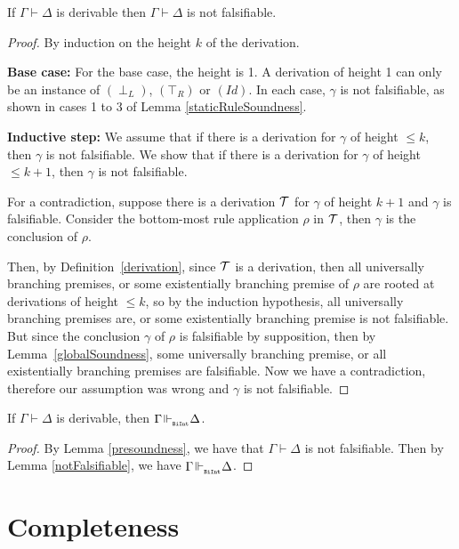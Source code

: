 \documentclass{llncs}
\numberwithin{equation}{section}
\newcommand{\Lg}[1]{\mathtt{#1}}
\newcommand{\sequent}{\vdash}
\newcommand{\Bottom}{\perp}
\newcommand{\Top}{\top}
\newcommand{\mycal}[1]{
        {\cal{#1}}
}
\newcommand {\BiInt}{
        \Lg{BiInt}
}
\newcommand{\tree}[1]{
        {\mycal{#1}}
}
\newcommand{\IdRule}{(Id)}
\newcommand{\FalseLeftRule}{(\Bottom_L)}
\newcommand{\TrueRightRule}{(\Top_R)}
\newcommand{\entails}{\hspace{-0.05cm}\Vdash_{_{\BiInt}}\hspace{-0.1cm}}
\begin{document}
\begin{lemma}\label{presoundness} If $\Gamma \sequent \Delta$ is derivable then $\Gamma \sequent \Delta$ is not falsifiable.
\end{lemma}
\begin{proof}
By induction on the height $k$ of the derivation. 

\textbf{Base case:} For the base case, the height is 1. A derivation of height 1 can only be an instance of $\FalseLeftRule$, $\TrueRightRule$ or $\IdRule$. In each case, $\gamma$ is not falsifiable, as shown in cases 1 to 3 of Lemma \ref{staticRuleSoundness}.

\textbf{Inductive step:} We assume that if there is a derivation for $\gamma$ of height $\leq k$, then $\gamma$ is not falsifiable. We show that if there is a derivation for $\gamma$ of height $\leq k+1$, then $\gamma$ is not falsifiable. 

For a contradiction, suppose there is a derivation $\tree{T}$ for $\gamma$ of height $k+1$ and $\gamma$ is falsifiable. Consider the bottom-most rule application $\rho$ in $\tree{T}$, then $\gamma$ is the conclusion of $\rho$.

Then, by Definition~\ref{derivation}, since $\tree{T}$ is a derivation, then all universally branching premises, or some existentially branching premise of $\rho$ are rooted at derivations of height $\leq k$, so by the induction hypothesis, all universally branching premises are, or some existentially branching premise is not falsifiable. But since the conclusion $\gamma$ of $\rho$ is falsifiable by supposition, then by Lemma~\ref{globalSoundness}, some universally branching premise, or all existentially branching premises are falsifiable. Now we have a contradiction, therefore our assumption was wrong and $\gamma$ is not falsifiable.
\end{proof}

\begin{theorem}[Soundness] If $\Gamma \sequent \Delta$ is derivable, then $\Gamma \entails \Delta$.
\end{theorem}
\begin{proof}
By Lemma \ref{presoundness}, we have that $\Gamma \sequent \Delta$ is not falsifiable. Then by Lemma \ref{notFalsifiable}, we have $\Gamma \entails \Delta$.
\end{proof}

\section{Completeness}\label{completeness}
\end{document}
